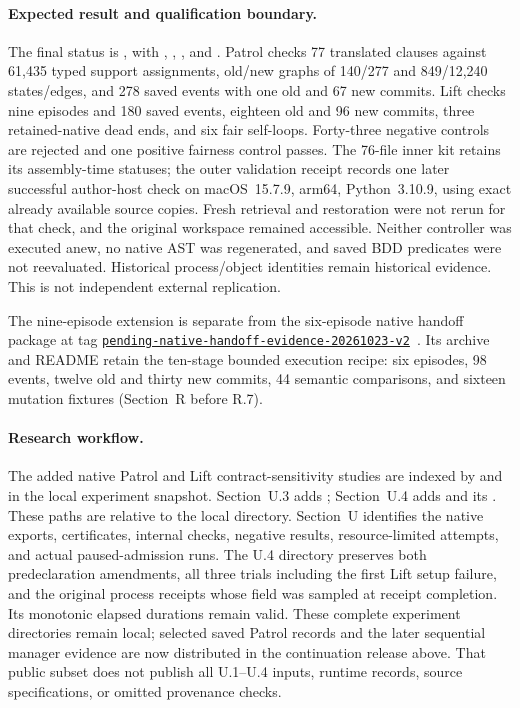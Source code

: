 \paragraph{Expected result and qualification boundary.}
The final status is ,
with , ,
, and .
Patrol checks 77 translated clauses against 61,435 typed support assignments,
old/new graphs of 140/277 and 849/12,240 states/edges, and 278 saved events
with one old and 67 new commits. Lift checks nine episodes and 180 saved
events, eighteen old and 96 new commits, three retained-native dead ends,
and six fair self-loops. Forty-three negative controls are rejected and
one positive fairness control passes.
The 76-file inner kit retains its assembly-time statuses; the outer
validation receipt records one later successful author-host check on
macOS~15.7.9, arm64, Python~3.10.9, using exact already available source
copies. Fresh retrieval and restoration were not rerun for that check,
and the original workspace remained accessible. Neither controller was
executed anew, no native AST was regenerated, and saved BDD predicates
were not reevaluated. Historical process/object identities remain
historical evidence. This is not independent external replication.

The nine-episode extension is separate from the six-episode native
handoff package at tag
\href{https://github.com/research-artifact-archive/seams2027/tree/pending-native-handoff-evidence-20261023-v2}{\nolinkurl{pending-native-handoff-evidence-20261023-v2}}~\cite{pendingartifact}.
Its archive  and
README retain the ten-stage bounded execution recipe: six episodes,
98 events, twelve old and thirty new commits, 44 semantic comparisons,
and sixteen mutation fixtures (Section~R before R.7).

\paragraph{Research workflow.}
The added native Patrol and Lift contract-sensitivity studies are indexed
by  and
 in the
local experiment snapshot. Section~U.3 adds
; Section~U.4 adds
 and its
. These paths are relative to the local
 directory. Section~U identifies the native exports,
certificates, internal checks, negative results, resource-limited attempts,
and actual paused-admission runs. The U.4 directory preserves both
predeclaration amendments, all three trials including the first Lift
setup failure, and the original process receipts whose
 field was sampled at receipt completion. Its monotonic
elapsed durations remain valid. These complete experiment directories
remain local; selected saved Patrol records and the later sequential
manager evidence are now distributed in the continuation release above.
That public subset does not publish all U.1--U.4 inputs, runtime records,
source specifications, or omitted provenance checks.
